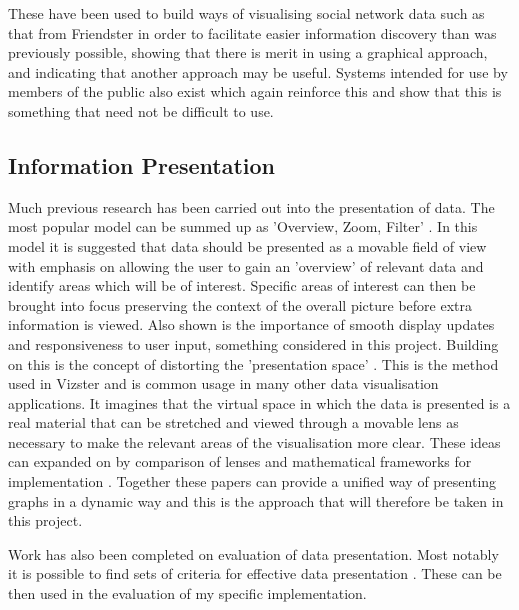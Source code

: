 \documentclass[12pt,a4paper]{article}
\begin{document}
These have been used to build ways of visualising social network data such as that from Friendster \cite{heer2005vizster} in order to facilitate easier information discovery than was previously possible, showing that there is merit in using a graphical approach, and indicating that another approach may be useful. Systems intended for use by members of the public also exist \cite{wolfram} which again reinforce this and show that this is something that need not be difficult to use.

\subsection{Information Presentation}
\noindent
Much previous research has been carried out into the presentation of data. The most popular model can be summed up as 'Overview, Zoom, Filter' \cite{shneiderman1996eyes}. In this model it is suggested that data should be presented as a movable field of view with emphasis on allowing the user to gain an 'overview' of relevant data and identify areas which will be of interest. Specific areas of interest can then be brought into focus preserving the context of the overall picture before extra information is viewed. Also shown is the importance of smooth display updates and responsiveness to user input, something considered in this project. Building on this is the concept of distorting the 'presentation space' \cite{carpendale2001framework}. This is the method used in Vizster and is common usage in many other data visualisation applications. It imagines that the virtual space in which the data is presented is a real material that can be stretched and viewed through a movable lens as necessary to make the relevant areas of the visualisation more clear. These ideas can expanded on by comparison of lenses and mathematical frameworks for implementation \cite{leung1994review}. Together these papers can provide a unified way of presenting graphs in a dynamic way and this is the approach that will therefore be taken in this project.

Work has also been completed on evaluation of data presentation. Most notably it is possible to find sets of criteria for effective data presentation \cite{tufte1983visual}. These can be then used in the evaluation of my specific implementation.
\end{document}
